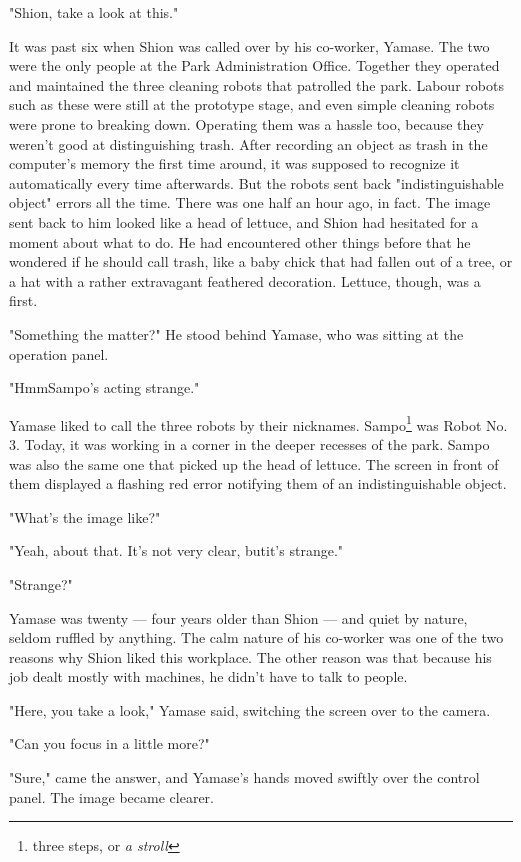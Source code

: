 \mybreak

"Shion, take a look at this."

It was past six when Shion was called over by his co-worker, Yamase. The
two were the only people at the Park Administration Office. Together
they operated and maintained the three cleaning robots that patrolled
the park. Labour robots such as these were still at the prototype stage,
and even simple cleaning robots were prone to breaking down. Operating
them was a hassle too, because they weren't good at distinguishing
trash. After recording an object as trash in the computer's memory the
first time around, it was supposed to recognize it automatically every
time afterwards. But the robots sent back "indistinguishable object"
errors all the time. There was one half an hour ago, in fact. The image
sent back to him looked like a head of lettuce, and Shion had hesitated
for a moment about what to do. He had encountered other things before
that he wondered if he should call trash, like a baby chick that had
fallen out of a tree, or a hat with a rather extravagant feathered
decoration. Lettuce, though, was a first.

"Something the matter?" He stood behind Yamase, who was sitting at the
operation panel.

"Hmm\el Sampo's acting strange."

Yamase liked to call the three robots by their nicknames. Sampo\footnote{three steps, or \emph{a stroll}} was
Robot No. 3. Today, it was working in a corner in the deeper recesses of
the park. Sampo was also the same one that picked up the head of
lettuce. The screen in front of them displayed a flashing red error
notifying them of an indistinguishable object.

"What's the image like?"

"Yeah, about that. It's not very clear, but\el it's strange."

"Strange?"

Yamase was twenty --- four years older than Shion --- and quiet by nature,
seldom ruffled by anything. The calm nature of his co-worker was one of
the two reasons why Shion liked this workplace. The other reason was
that because his job dealt mostly with machines, he didn't have to talk
to people.

"Here, you take a look," Yamase said, switching the screen over to the
camera.

"Can you focus in a little more?"

"Sure," came the answer, and Yamase's hands moved swiftly over the
control panel. The image became clearer.


